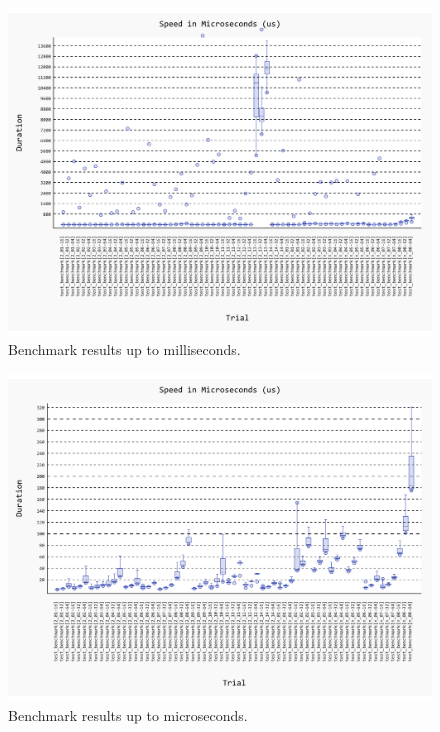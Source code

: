 \documentclass[conference]{IEEEtran}
\begin{document}
\begin{figure}[H]
    \centering
    \includegraphics[width=\linewidth]{figures/benchmark/20241119_211111.pdf}
    \caption{Benchmark results up to milliseconds.}
    \label{fig:benchmark_in_ms}
\end{figure}

\begin{figure}[H]
    \centering
    \includegraphics[width=\linewidth]{figures/benchmark/20241119_210152.pdf}
    \caption{Benchmark results up to microseconds.}
    \label{fig:benchmark_in_us}
\end{figure}

\end{document}
